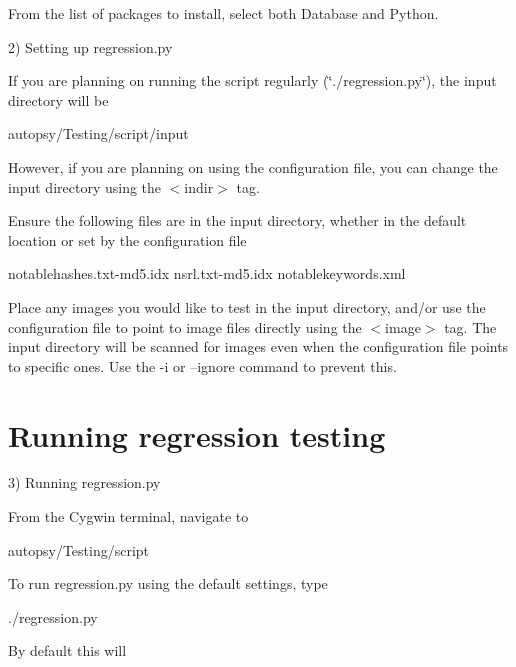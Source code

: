 From the list of packages to install, select both Database and Python.

2) Setting up regression.\+py

If you are planning on running the script regularly (\char`\"{}./regression.\+py\char`\"{}), the input directory will be \begin{DoxyVerb}    autopsy/Testing/script/input
\end{DoxyVerb}


However, if you are planning on using the configuration file, you can change the input directory using the $<$indir$>$ tag.

Ensure the following files are in the input directory, whether in the default location or set by the configuration file \begin{DoxyVerb}    notablehashes.txt-md5.idx
    nsrl.txt-md5.idx
    notablekeywords.xml
\end{DoxyVerb}


Place any images you would like to test in the input directory, and/or use the configuration file to point to image files directly using the $<$image$>$ tag. The input directory will be scanned for images even when the configuration file points to specific ones. Use the -\/i or --ignore command to prevent this.\hypertarget{regression_test_page_regression_test_running}{}\section{Running regression testing}\label{regression_test_page_regression_test_running}
3) Running regression.\+py

From the Cygwin terminal, navigate to \begin{DoxyVerb}autopsy/Testing/script
\end{DoxyVerb}


To run regression.\+py using the default settings, type \begin{DoxyVerb}./regression.py
\end{DoxyVerb}


By default this will


